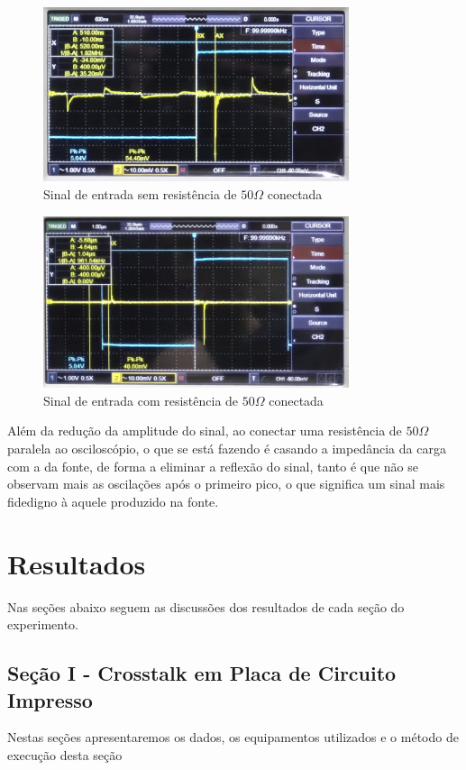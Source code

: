 \documentclass[12pt]{article}
\begin{document}
\begin{figure}[H]
  \centering
  \includegraphics[width=0.8\textwidth]{img/sem-resistencia.png}
  \caption{Sinal de entrada sem resistência de $50\Omega$ conectada}
  \label{fig:img/sem-resistencia.png}
\end{figure}
\begin{figure}[H]
  \centering
  \includegraphics[width=0.8\textwidth]{img/com-resistencia.png}
  \caption{Sinal de entrada com resistência de $50\Omega$ conectada}
  \label{fig:img/com-resistencia.png}
\end{figure}

Além da redução da amplitude do sinal, ao conectar uma resistência de
$50\Omega$ paralela ao osciloscópio, o que se está fazendo é casando a
impedância da carga com a da fonte, de forma a eliminar a reflexão do
sinal, tanto é que não se observam mais as oscilações após o primeiro
pico, o que significa um sinal mais fidedigno à aquele produzido na fonte.
\section{Resultados}
Nas seções abaixo seguem as discussões dos resultados de cada seção
do experimento.

\subsection{Seção I -  Crosstalk em Placa de Circuito Impresso}
Nestas seções apresentaremos os dados, os equipamentos utilizados e o
método de execução desta seção
\end{document}

